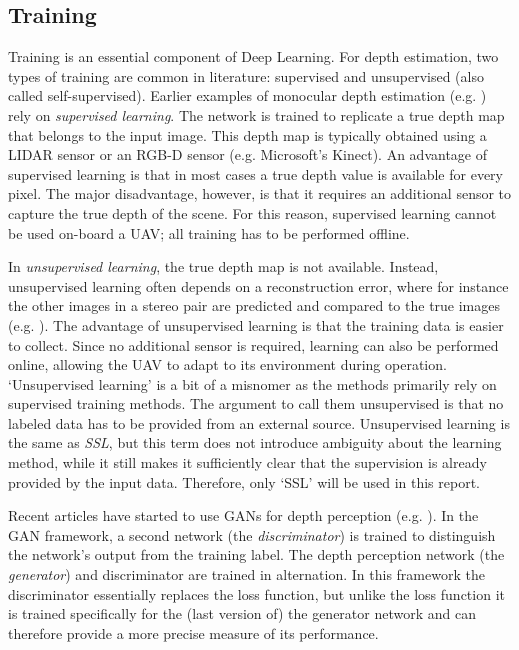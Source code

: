 \subsection{Training}
\label{sec:dl_training}
Training is an essential component of Deep Learning.
For depth estimation, two types of training are common in literature: supervised and unsupervised (also called self-supervised).
Earlier examples of monocular depth estimation (e.g. \cite{Eigen2014}) rely on \emph{supervised learning}.
The network is trained to replicate a true depth map that belongs to the input image.
This depth map is typically obtained using a LIDAR sensor or an RGB-D sensor (e.g. Microsoft's Kinect).
An advantage of supervised learning is that in most cases a true depth value is available for every pixel.
The major disadvantage, however, is that it requires an additional sensor to capture the true depth of the scene.
For this reason, supervised learning cannot be used on-board a \ac{UAV}; all training has to be performed offline.


In \emph{unsupervised learning}, the true depth map is not available.
Instead, unsupervised learning often depends on a reconstruction error, where for instance the other images in a stereo pair are predicted and compared to the true images (e.g. \cite{Garg2016}).
The advantage of unsupervised learning is that the training data is easier to collect.
Since no additional sensor is required, learning can also be performed online, allowing the \ac{UAV} to adapt to its environment during operation.
`Unsupervised learning' is a bit of a misnomer as the methods primarily rely on supervised training methods.
The argument to call them unsupervised is that no labeled data has to be provided from an external source.
Unsupervised learning is the same as \emph{\acf{SSL}}, but this term does not introduce ambiguity about the learning method, while it still makes it sufficiently clear that the supervision is already provided by the input data.
Therefore, only `\ac{SSL}' will be used in this report.


Recent articles have started to use \acp{GAN} for depth perception (e.g. \cite{Pilzer2018a,Chen2018}).
In the \ac{GAN} framework, a second network (the \emph{discriminator}) is trained to distinguish the network's output from the training label.
The depth perception network (the \emph{generator}) and discriminator are trained in alternation.
In this framework the discriminator essentially replaces the loss function, but unlike the loss function it is trained specifically for the (last version of) the generator network and can therefore provide a more precise measure of its performance.

